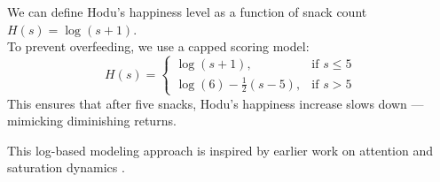\documentclass[sigconf]{acmart}
\begin{document}
\begin{CJK}{UTF8}{mj}
We can define Hodu’s happiness level as a function of 
snack count $H(s) = \log(s + 1)$. \\
To prevent overfeeding, we use a capped scoring model:
 \begin{equation}
  H(s) = 
  \begin{cases}
    \log(s + 1), & \text{if } s \leq 5 \\
    \log(6) - \frac{1}{2}(s - 5), & \text{if } s > 5
  \end{cases}
 \end{equation}
This ensures that after five snacks, Hodu’s happiness 
increase slows down — mimicking diminishing returns.

This log-based modeling approach is inspired by earlier work on attention and saturation 
dynamics \cite{vaswani2017attention}.




\end{CJK}
\end{document}
